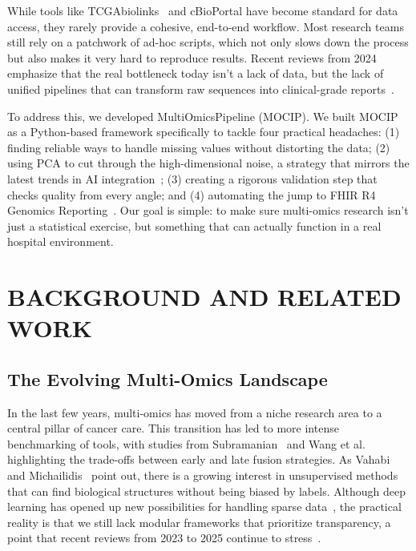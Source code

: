 \documentclass[twocolumn]{article}
\begin{document}
While tools like TCGAbiolinks~\cite{colaprico2016} and cBioPortal have become standard for data access, they rarely provide a cohesive, end-to-end workflow. Most research teams still rely on a patchwork of ad-hoc scripts, which not only slows down the process but also makes it very hard to reproduce results. Recent reviews from 2024 emphasize that the real bottleneck today isn't a lack of data, but the lack of unified pipelines that can transform raw sequences into clinical-grade reports~\cite{abdelaziz2024multi,hernandez2024methods}.

To address this, we developed MultiOmicsPipeline (MOCIP). We built MOCIP as a Python-based framework specifically to tackle four practical headaches: (1) finding reliable ways to handle missing values without distorting the data; (2) using PCA to cut through the high-dimensional noise, a strategy that mirrors the latest trends in AI integration~\cite{nam2024harnessing}; (3) creating a rigorous validation step that checks quality from every angle; and (4) automating the jump to FHIR R4 Genomics Reporting~\cite{mandel2016}. Our goal is simple: to make sure multi-omics research isn't just a statistical exercise, but something that can actually function in a real hospital environment.

\section{\uppercase{Background and Related Work}}

\subsection{The Evolving Multi-Omics Landscape}
In the last few years, multi-omics has moved from a niche research area to a central pillar of cancer care. This transition has led to more intense benchmarking of tools, with studies from Subramanian~\cite{subramanian2020} and Wang et al.~\cite{wang2021evaluation} highlighting the trade-offs between early and late fusion strategies. As Vahabi and Michailidis~\cite{vahabi2022unsupervised} point out, there is a growing interest in unsupervised methods that can find biological structures without being biased by labels. Although deep learning has opened up new possibilities for handling sparse data~\cite{kang2022roadmap}, the practical reality is that we still lack modular frameworks that prioritize transparency, a point that recent reviews from 2023 to 2025 continue to stress~\cite{wekesa2023review,abdelaziz2024multi,muneer2025review}.
\end{document}
